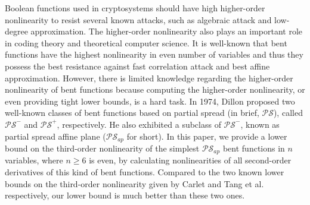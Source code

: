 


Boolean functions used in cryptosystems should have high higher-order nonlinearity to resist several known attacks,
such as algebraic attack and low-degree approximation. The higher-order nonlinearity also plays an important role in coding theory and theoretical computer science. It is well-known that bent functions have the highest nonlinearity in even number of variables and thus they possess
the best resistance against fast correlation attack and best affine approximation. However, there is limited knowledge regarding the higher-order nonlinearity of bent functions because computing the higher-order nonlinearity, or even providing tight lower bounds, is a hard task.
In 1974, Dillon proposed two well-known classes of bent functions based on partial spread (in brief, $\mathcal{PS}$), called $\mathcal{PS}^-$ and $\mathcal{PS}^+$, respectively. He also exhibited a subclass of  $\mathcal{PS}^-$, known as partial spread affine plane ($\mathcal{PS}_{ap}$ for short). In this paper, we provide a lower bound on the third-order nonlinearity of the simplest $\mathcal{PS}_{ap}$ bent functions in $n$ variables, where $n\ge 6$ is even, by calculating nonlinearities of all second-order derivatives of this kind of bent functions.
Compared to the two known lower bounds on the third-order nonlinearity given by Carlet and Tang et al. respectively,
our lower bound is much better than these two ones.



















































